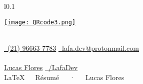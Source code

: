 \documentclass[11pt, a4paper]{awesome-cv}
\begin{document}
\newline
\makecvheader[L]
\begin{wrapfigure}{l}{0.1\textwidth}
  \begin{center}
    \href{https://wa.me/message/7QZXUVB4LDJMH1}{\texttt{[image: QRcode3.png]}}
  \end{center}
\end{wrapfigure}
\\
\href{tel:21966637783}{\faPhone\acvHeaderIconSep\ (21) 96663-7783}
\hspace{0.5cm}
\href{mailto:lafa.dev@protonmail.com}{\faEnvelope\acvHeaderIconSep\ lafa.dev@protonmail.com}
\hspace{0.5cm}
\\
\\
\href{https://www.linkedin.com/in/lafa}{\faLinkedinSquare\acvHeaderIconSep\@ Lucas Flores}
\hspace{1.1cm}
\href{https://github.com/LafaDev}{\faGithubSquare\acvHeaderIconSep\ /LafaDev}
\hspace{2cm}
\\


\makecvfooter
  {}
  {\LaTeX~~~Résumé~~~·~~~Lucas Flores}
  {}








\end{document}
